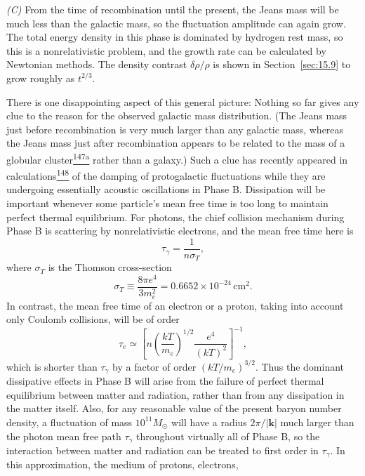 \emph{(C)} From the time of recombination until the present, the Jeans mass
will be much less than the galactic mass, so the fluctuation amplitude can
again grow. The total energy density in this phase is dominated by hydrogen
rest mass, so this is a nonrelativistic problem, and the growth rate can be
calculated by Newtonian methods. The density contrast \(\delta\rho/\rho\) is
shown in Section~\ref{sec:15.9} to grow roughly as \(t^{2/3}\).

There is one disappointing aspect of this general picture: Nothing so far
gives any clue to the reason for the observed galactic mass distribution.
(The Jeans mass just before recombination is very much larger than any
galactic mass, whereas the Jeans mass just after recombination appears to be
related to the mass of a globular
cluster\hyperref[ch15-ref-147a]{\textsuperscript{147a}} rather than a
galaxy.) Such a clue has recently appeared in
calculations\hyperref[ch15-ref-148]{\textsuperscript{148}} of the damping of
protogalactic fluctuations while they are undergoing essentially acoustic
oscillations in Phase B. Dissipation will be important whenever some
particle's mean free time is too long to maintain perfect thermal equilibrium.
For photons, the chief collision mechanism during Phase B is scattering by
nonrelativistic electrons, and the mean free time here is
\begin{equation}
  \tau_\gamma=\frac{1}{n\sigma_T},
  \tag{15.8.26}\label{eq:15.8.26}
\end{equation}
where \(\sigma_T\) is the Thomson cross-section
\[
  \sigma_T
  \equiv
  \frac{8\pi e^4}{3m_e^2}
  =
  0.6652\times10^{-24}\,\mathrm{cm^2}.
\]
In contrast, the mean free time of an electron or a proton, taking into
account only Coulomb collisions, will be of order
\[
  \tau_e
  \simeq
  \left[
    n\left(\frac{kT}{m_e}\right)^{1/2}
    \frac{e^4}{(kT)^2}
  \right]^{-1},
\]
which is shorter than \(\tau_\gamma\) by a factor of order
\((kT/m_e)^{3/2}\). Thus the dominant dissipative effects in Phase B will
arise from the failure of perfect thermal equilibrium between matter and
radiation, rather than from any dissipation in the matter itself. Also, for
any reasonable value of the present baryon number density, a fluctuation of
mass \(10^{11}M_\odot\) will have a radius
\(2\pi/\lvert\mathbf k\rvert\) much larger than the photon mean free path
\(\tau_\gamma\) throughout virtually all of Phase B, so the interaction
between matter and radiation can be treated to first order in
\(\tau_\gamma\). In this approximation, the medium of protons, electrons,

